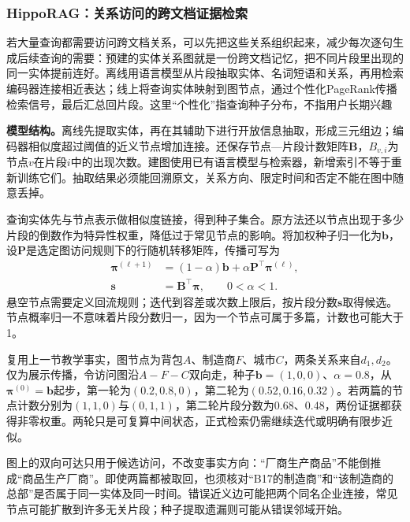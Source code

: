 \Needspace{100mm}
\subsubsection{HippoRAG：关系访问的跨文档证据检索}
\label{sec:rs-search-hipporag}

若大量查询都需要访问跨文档关系，可以先把这些关系组织起来，减少每次逐句生成后续查询的需要：预建的实体关系图就是一份跨文档记忆，把不同片段里出现的同一实体提前连好。离线用语言模型从片段抽取实体、名词短语和关系，再用检索编码器连接相近表达；线上将查询实体映射到图节点，通过个性化PageRank传播检索信号，最后汇总回片段。这里“个性化”指查询种子分布，不指用户长期兴趣

\textbf{模型结构。}离线先提取实体，再在其辅助下进行开放信息抽取，形成三元组边；编码器相似度超过阈值的近义节点增加连接。还保存节点—片段计数矩阵$\bm B$，$B_{v,i}$为节点$v$在片段$i$中的出现次数。建图使用已有语言模型与检索器，新增索引不等于重新训练它们。抽取结果必须能回溯原文，关系方向、限定时间和否定不能在图中随意丢掉。

查询实体先与节点表示做相似度链接，得到种子集合。原方法还以节点出现于多少片段的倒数作为特异性权重，降低过于常见节点的影响。将加权种子归一化为$\bm b$，设$\bm P$是选定图访问规则下的行随机转移矩阵，传播可写为
\begin{equation}
 \begin{split}
 \bm\pi^{(\ell+1)}&=(1-\alpha)\bm b+
                         \alpha\bm P^\top\bm\pi^{(\ell)},\\
 \bm s&=\bm B^\top\bm\pi,\qquad 0<\alpha<1 .
 \end{split}
 \label{eq:rs-search-hipporag}
\end{equation}
悬空节点需要定义回流规则；迭代到容差或次数上限后，按片段分数$\bm s$取得候选。节点概率归一不意味着片段分数归一，因为一个节点可属于多篇，计数也可能大于1。

复用上一节教学事实，图节点为背包$A$、制造商$F$、城市$C$，两条关系来自$d_1,d_2$。仅为展示传播，令访问图沿$A-F-C$双向走，种子$\bm b=(1,0,0)$、$\alpha=0.8$，从$\bm\pi^{(0)}=\bm b$起步，第一轮为$(0.2,0.8,0)$，第二轮为$(0.52,0.16,0.32)$。若两篇的节点计数分别为$(1,1,0)$与$(0,1,1)$，第二轮片段分数为0.68、0.48，两份证据都获得非零权重。两轮只是可复算中间状态，正式检索仍需继续迭代或明确有限步近似。

图上的双向可达只用于候选访问，不改变事实方向：“厂商生产商品”不能倒推成“商品生产厂商”。即使两篇都被取回，也须核对“B17的制造商”和“该制造商的总部”是否属于同一实体及同一时间。错误近义边可能把两个同名企业连接，常见节点可能扩散到许多无关片段；种子提取遗漏则可能从错误邻域开始。

